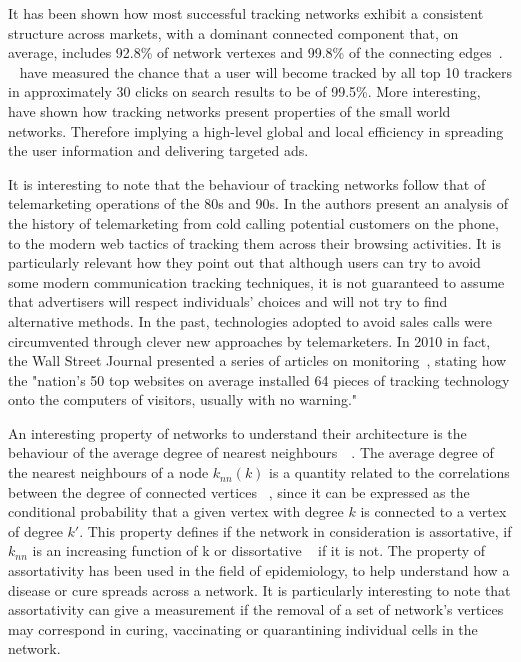 It has been shown how most successful tracking networks exhibit a consistent structure across markets, with a dominant connected component that, on average, includes 92.8\% of network vertexes and 99.8\% of the connecting edges~\cite{gomer2013network}. ~\cite{gomer2013network} have measured the chance that a user will become tracked by all top 10 trackers in approximately 30 clicks on search results to be of 99.5\%. More interesting, ~\cite{gomer2013network} have shown how tracking networks present properties of the small world networks. Therefore implying a high-level global and local efficiency in spreading the user information and delivering targeted ads.

It is interesting to note that the behaviour of tracking networks follow that of telemarketing operations of the 80s and 90s. In \cite{hoofnagle2012behavioral} the authors present an analysis of the history of telemarketing from cold calling potential customers on the phone, to the modern web tactics of tracking them across their browsing activities. It is particularly relevant how they point out that although users can try to avoid some modern communication tracking techniques, it is not guaranteed to assume that advertisers will respect individuals' choices and will not try to find alternative methods. In the past, technologies adopted to avoid sales calls were circumvented through clever new approaches by telemarketers. In 2010 in fact, the Wall Street Journal presented a series of articles on monitoring~\cite{angwin2010web}, stating how the "nation's 50 top websites on average installed 64 pieces of tracking technology onto the computers of visitors, usually with no warning."

An interesting property of networks to understand their architecture is the behaviour of the average degree of nearest neighbours~\cite{barrat2004architecture}~\cite{pastor2001dynamical}. The average degree of the nearest neighbours of a node $k_{nn}(k)$ is a quantity related to the correlations between the degree of connected vertices ~\cite{maslov2002specificity}, since it can be expressed as the conditional probability that a given vertex with degree $k$ is connected to a vertex of degree $k'$. This property defines if the network in consideration is assortative, if $k_{nn}$ is an increasing function of k or dissortative ~\cite{newman2002assortative} if it is not. The property of assortativity has been used  in the field of epidemiology, to help understand how a disease or cure spreads across a network. It is particularly interesting to note that assortativity can give a measurement if the removal of a set of network's vertices may correspond in curing, vaccinating or quarantining individual cells in the network. 

